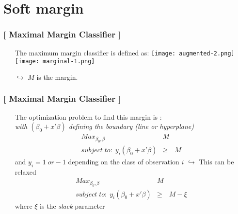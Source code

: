 \documentclass[xcolor=x11names,compress, handhouts]{beamer}
\renewcommand{\(}{\begin{columns}}
\renewcommand{\)}{\end{columns}}
\newcommand{\<}[1]{\begin{column}{#1}}
\renewcommand{\>}{\end{column}}
\begin{document}
\section{Soft margin}

\begin{frame}
\frametitle{\textcolor{brique}{[ Maximal Margin Classifier ]}}
\pause
\begin{itemize}[<+->]
    \item[] The maximum margin classifier is defined as:
      {\texttt{[image: augmented-2.png]} \\ }
      {\texttt{[image: marginal-1.png]} \\ }
    \item[$\hookrightarrow$] $M$ is the margin.
\end{itemize}
\end{frame}


\begin{frame}
\frametitle{\textcolor{brique}{[ Maximal Margin Classifier ]}}
\pause
\begin{itemize}[<+->]
    \item[] The optimization problem to find this margin is :\\
     {\emph{with $(\beta_0 +x'\beta)$ defining the boundary (line or hyperplane) }\\}
     {\begin{eqnarray*}
                Max_{\beta_0, \beta} & M & \\
                subject\; to:\; y_i(\beta_0 +x' \beta) &\geq &  M
               \end{eqnarray*}
               }
     {and $y_i = 1 \; or -1$ depending on the class of observation $i$ }
     {$\hookrightarrow$ This can be relaxed  \\ }
     {\begin{eqnarray*}
                Max_{\beta_0, \beta} & M & \\
                subject\; to:\; y_i(\beta_0 +x' \beta) &\geq &  M - \xi
               \end{eqnarray*}
               }
    {where $\xi$  is the \textit{slack} parameter}
\end{itemize}
\end{frame}
\end{document}
